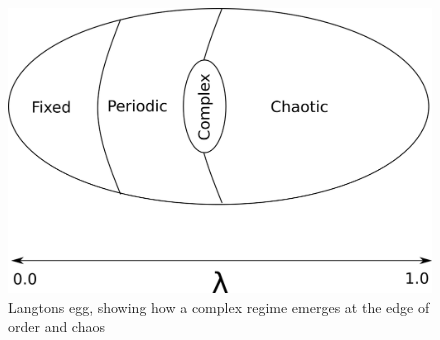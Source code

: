 \begin{figure}[h!]
  \centering
  \includegraphics[width=1\textwidth]{fig/egg.png}
  \caption{Langtons egg, showing how a complex regime emerges at the edge of
    order and chaos}
  \label{figCAegg}
\end{figure}
